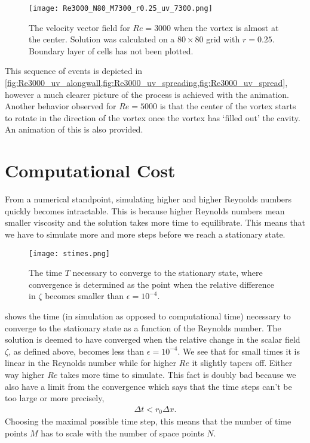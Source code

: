 \documentclass[10pt,a4paper,twocolumn]{article}
\begin{document}
\begin{figure}[!b]
    \centering
    \texttt{[image: Re3000\_N80\_M7300\_r0.25\_uv\_7300.png]}
    \caption{The velocity vector field for $Re=3000$ when the vortex is almost at the center. Solution was calculated on a $80 \times 80$ grid with $r=0.25$. Boundary layer of cells has not been plotted.}
    \label{fig:Re3000_uv_spread}
\end{figure}

This sequence of events is depicted in \cref{fig:Re3000_uv_alongwall,fig:Re3000_uv_spreading,fig:Re3000_uv_spread}, however a much clearer picture of the process is achieved with the animation. Another behavior observed for $Re=5000$ is that the center of the vortex starts to rotate in the direction of the vortex once the vortex has `filled out' the cavity. An animation of this is also provided.


\section{Computational Cost}

From a numerical standpoint, simulating higher and higher Reynolds numbers quickly becomes intractable. This is because higher Reynolds numbers mean smaller viscosity and the solution takes more time to equilibrate. This means that we have to simulate more and more steps before we reach a stationary state.

\begin{figure}[!h]
    \centering
    \texttt{[image: stimes.png]}
    \caption{The time $T$ necessary to converge to the stationary state, where convergence is determined as the point when the relative difference in $\zeta$ becomes smaller than $\epsilon=10^{-4}$.}
    \label{fig:stimes}
\end{figure}

 shows the time (in simulation as opposed to computational time) necessary to converge to the stationary state as a function of the Reynolds number. The solution is deemed to have converged when the relative change in the scalar field $\zeta$, as defined above, becomes less than $\epsilon=10^{-4}$. We see that for small times it is linear in the Reynolds number while for higher $Re$ it slightly tapers off. Either way higher $Re$ takes more time to simulate. This fact is doubly bad because we also have a limit from the convergence which says that the time steps can't be too large or more precisely,
%
\begin{align}
    \Delta t < r_{0} \Delta x.
\end{align}
%
Choosing the maximal possible time step, this means that the number of time points $M$ has to scale with the number of space points $N$. 
\end{document}
